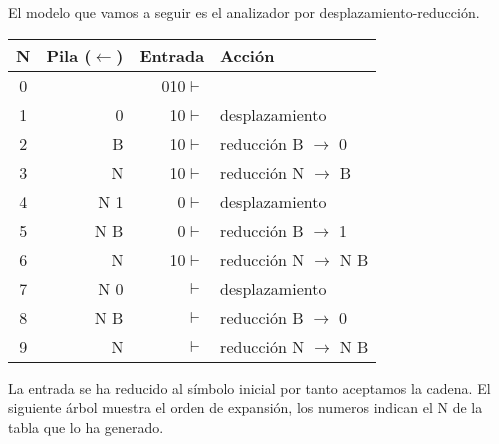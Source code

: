 \documentclass[\main/ApuntesPL.tex]{subfiles}
\begin{document}
    \par
    El modelo que vamos a seguir es el analizador por desplazamiento-reducción.

    \begin{center}
      \begin{tabular}{||c r r l||}
        \hline
        N & Pila ($\leftarrow$) & Entrada & Acción \\ [0.5ex]
        \hline\hline
        0 &  & 010$\vdash$ & \\
        \hline
        1 & 0 & 10$\vdash$ & desplazamiento\\
        \hline
        2 & B & 10$\vdash$ & reducción B $\rightarrow$ 0\\
        \hline
        3 & N & 10$\vdash$ & reducción N $\rightarrow$ B\\
        \hline
        4 & N 1 & 0$\vdash$ & desplazamiento\\
        \hline
        5 & N B & 0$\vdash$ & reducción B $\rightarrow$ 1\\
        \hline
        6 & N & 10$\vdash$ & reducción N $\rightarrow$ N B\\
        \hline
        7 & N 0 & $\vdash$ & desplazamiento\\
        \hline
        8 & N B & $\vdash$ & reducción B $\rightarrow$ 0\\
        \hline
        9 & N & $\vdash$ & reducción N $\rightarrow$ N B\\ [1ex]
        \hline
      \end{tabular}
    \end{center}

    \par
    La entrada se ha reducido al símbolo inicial por tanto aceptamos la cadena. El siguiente
    árbol muestra el orden de expansión, los numeros indican el N de la tabla que lo ha generado.
\end{document}

